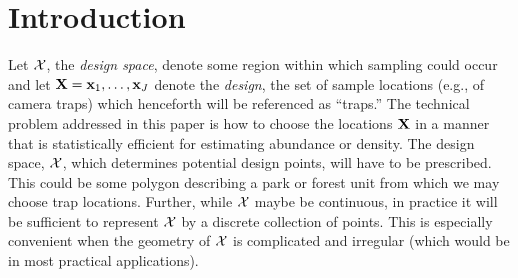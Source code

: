 \documentclass[useAMS,referee]{biom}
\begin{document}
\maketitle


%






\linenumbers

\section{Introduction}



Let ${\cal X}$, the {\it design space}, denote some region within
which sampling could occur and let ${\bf X} = {\bf x}_{1},\ldots, {\bf
  x}_{J}$ denote the {\it design}, the set of sample locations (e.g.,
of camera traps) which henceforth will be referenced as ``traps.'' The
technical problem addressed in this paper is how to choose the
locations ${\bf X}$ in a manner that is statistically efficient for
estimating abundance or density.  The design space, ${\cal X}$, which
determines potential design points, will have to be prescribed.  This
could be some polygon describing a park or forest unit from which
we may choose trap locations.  Further, while ${\cal X}$ maybe be
continuous, 
in practice it will be sufficient to represent ${\cal X}$ by a
discrete collection of points.  This is especially convenient when
the geometry of ${\cal X}$ is complicated and irregular (which would
be in most practical applications).
\end{document}
